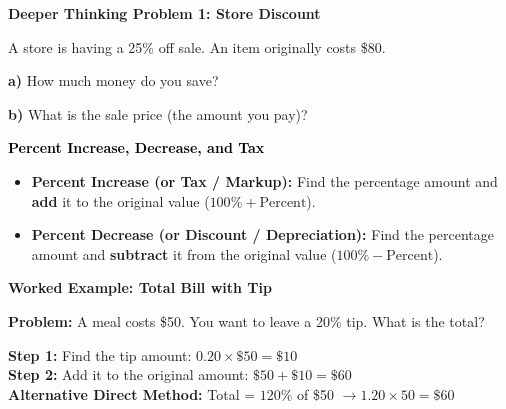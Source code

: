 \documentclass[12pt, letterpaper, fleqn]{article}
\begin{document}
\vspace{4mm}

\begin{tcolorbox}[colback=white!15, colframe=black, boxrule=1.5pt, arc=4mm, left=6mm, right=6mm, top=5mm, bottom=5mm]

\textbf{Deeper Thinking Problem 1: Store Discount}

\medskip

\noindent
A store is having a 25\% off sale. An item originally costs \$80.

\noindent
\textbf{a)} How much money do you save?

\vspace{2.7cm}

\noindent
\textbf{b)} What is the sale price (the amount you pay)?

\vspace{2.7cm}

\end{tcolorbox}

\newpage

\begin{tcolorbox}[colback=customteal!20]
    \large\textcolor{black}{\textbf{Percent Increase, Decrease, and Tax}}
\end{tcolorbox}

\vspace{3mm}

\begin{itemize}
    \item \textbf{Percent Increase (or Tax / Markup):} Find the percentage amount and \textbf{add} it to the original value ($100\% + \text{Percent}$).
    \item \textbf{Percent Decrease (or Discount / Depreciation):} Find the percentage amount and \textbf{subtract} it from the original value ($100\% - \text{Percent}$).
\end{itemize}

\vspace{3mm}

\begin{tcolorbox}[colback=white, colframe=black!25, boxrule=0.6pt, arc=4mm, left=6mm, right=6mm, top=5mm, bottom=5mm]

\textbf{Worked Example: Total Bill with Tip}

\medskip
\textbf{Problem:} A meal costs \$50. You want to leave a 20\% tip. What is the total?
\medskip

\noindent
\textbf{Step 1:} Find the tip amount: $0.20 \times \$50 = \$10$ \\
\textbf{Step 2:} Add it to the original amount: $\$50 + \$10 = \$60$ \\
\textbf{Alternative Direct Method:} Total = $120\%$ of \$50 $\rightarrow 1.20 \times 50 = \$60$

\end{tcolorbox}
\end{document}
